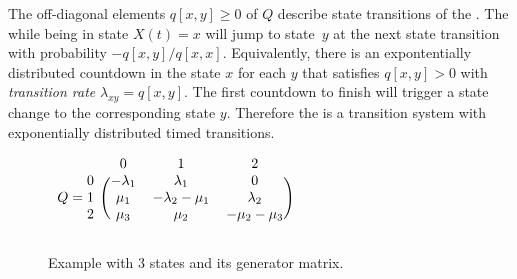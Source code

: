 The off-diagonal elements \(q[x, y] \ge 0\) of \(Q\) describe state transitions of the . The  while being in state \(X(t) = x\) will jump to state~\(y\) at the next state transition with probability \(-q[x, y] / q[x, x]\). Equivalently, there is an expontentially distributed countdown in the state \(x\) for each \(y\) that satisfies \(q[x, y] > 0\) with \emph{transition rate} $\lambda_{xy} = q[x, y]$. The first countdown to finish will trigger a state change to the corresponding state \(y\). Therefore the  is a transition system with exponentially distributed timed transitions.

\begin{figure}%
  \begin{minipage}{.5\textwidth}
    \centering
  \end{minipage}%
  \begin{minipage}{.5\textwidth}
    \centering
    \(\begin{blockarray}{rccc}
      & 0 & 1 & 2 \\
      \begin{block}{r(ccc)}
        0 & -\lambda_1 & \lambda_1 & 0 \\
        Q = 1 & \mu_1 & -\lambda_2 - \mu_1 & \lambda_2 \\
        2 & \mu_3 & \mu_2 & -\mu_2 - \mu_3 \\
      \end{block}
    \end{blockarray}\)
    \vspace{0.5cm}
  \end{minipage}
  \caption{Example  with 3 states and its generator matrix.}
  \label{fig:background:ctmc-repair}
\end{figure}

